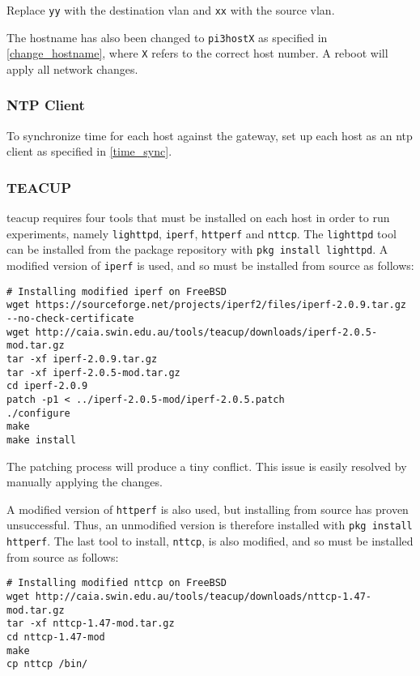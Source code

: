 Replace \lstinline{yy} with the destination \gls{vlan} and \lstinline{xx} with the source \gls{vlan}.

The hostname has also been changed to \lstinline{pi3hostX} as specified in \ref{change_hostname}, where \lstinline{X} refers to the correct host number. A reboot will apply all network changes.


\subsubsection{NTP Client}

To synchronize time for each host against the gateway, set up each host as an \gls{ntp} client as specified in \ref{time_sync}.


\subsubsection{TEACUP}

\gls{teacup} requires four tools that must be installed on each host in order to run experiments, namely \lstinline{lighttpd},  \lstinline{iperf}, \lstinline{httperf} and \lstinline{nttcp}. The \lstinline{lighttpd} tool can be installed from the package repository with \lstinline{pkg install lighttpd}. A modified version of \lstinline{iperf} is used, and so must be installed from source as follows:

\begin{verbatim}
# Installing modified iperf on FreeBSD
wget https://sourceforge.net/projects/iperf2/files/iperf-2.0.9.tar.gz --no-check-certificate
wget http://caia.swin.edu.au/tools/teacup/downloads/iperf-2.0.5-mod.tar.gz
tar -xf iperf-2.0.9.tar.gz
tar -xf iperf-2.0.5-mod.tar.gz
cd iperf-2.0.9
patch -p1 < ../iperf-2.0.5-mod/iperf-2.0.5.patch
./configure
make
make install
\end{verbatim}

The patching process will produce a tiny conflict. This issue is easily resolved by manually applying the changes.

A modified version of \lstinline{httperf} is also used, but installing from source has proven unsuccessful. Thus, an unmodified version is therefore installed with \lstinline{pkg install httperf}. The last tool to install, \lstinline{nttcp}, is also modified, and so must be installed from source as follows:

\begin{verbatim}
# Installing modified nttcp on FreeBSD
wget http://caia.swin.edu.au/tools/teacup/downloads/nttcp-1.47-mod.tar.gz
tar -xf nttcp-1.47-mod.tar.gz
cd nttcp-1.47-mod
make
cp nttcp /bin/
\end{verbatim}









